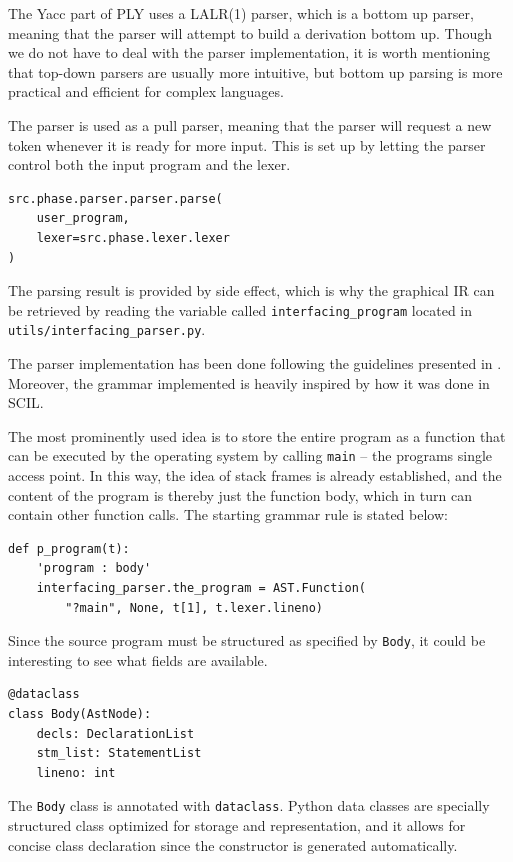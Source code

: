 The Yacc part of PLY uses a LALR(1) parser, which is a bottom up parser, meaning that the parser will attempt to build a derivation bottom up. Though we do not have to deal with the parser implementation, it is worth mentioning that top-down parsers are usually more intuitive, but bottom up parsing is more practical and efficient for complex languages. 

The parser is used as a pull parser, meaning that the parser will request a new token whenever it is ready for more input. This is set up by letting the parser control both the input program and the lexer. 

\begin{verbatim}
src.phase.parser.parser.parse(
    user_program,
    lexer=src.phase.lexer.lexer
)
\end{verbatim}

The parsing result is provided by side effect, which is why the graphical IR can be retrieved by reading the variable called \texttt{interfacing\_program} located in \texttt{utils/\-interfacing\_parser.py}. 

The parser implementation has been done following the guidelines presented in \cite[section 6][]{ply}. Moreover, the grammar implemented is heavily inspired by how it was done in SCIL. 

The most prominently used idea is to store the entire program as a function that can be executed by the operating system by calling \texttt{main} -- the programs single access point. In this way, the idea of stack frames is already established, and the content of the program is thereby just the function body, which in turn can contain other function calls. The starting grammar rule is stated below:

\begin{verbatim}
def p_program(t):
    'program : body'
    interfacing_parser.the_program = AST.Function(
        "?main", None, t[1], t.lexer.lineno)
\end{verbatim}

Since the source program must be structured as specified by \texttt{Body}, it could be interesting to see what fields are available.

\begin{verbatim}
@dataclass
class Body(AstNode):
    decls: DeclarationList
    stm_list: StatementList
    lineno: int    
\end{verbatim}

The \texttt{Body} class is annotated with \texttt{dataclass}. Python data classes are specially structured class optimized for storage and representation, and it allows for concise class declaration since the constructor is generated automatically.

